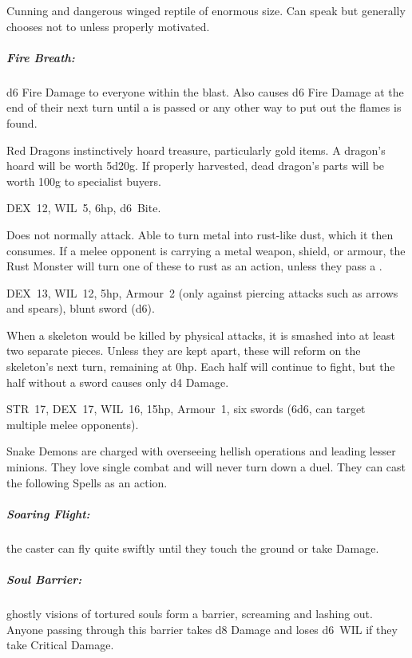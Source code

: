 \documentclass[itdr]{subfiles}
\begin{document}
Cunning and dangerous winged reptile of enormous size. Can speak but generally chooses not to unless properly motivated.

\subparagraph{Fire Breath:} d6 Fire Damage to everyone within the blast. Also causes d6 Fire Damage at the end of their next turn until a  is passed or any other way to put out the flames is found.

Red Dragons instinctively hoard treasure, particularly gold items. A dragon's hoard will be worth 5d20g. If properly harvested, dead dragon's parts will be worth 100g to specialist buyers.

\vfill
\break

\vfill

DEX~12, WIL~5, 6hp, d6~Bite.

Does not normally attack. Able to turn metal into rust-like dust, which it then consumes. If a melee opponent is carrying a metal weapon, shield, or armour, the Rust Monster will turn one of these to rust as an action, unless they pass a .

\vfill

DEX~13, WIL~12, 5hp, Armour~2 (only against piercing attacks such as arrows and spears), blunt sword (d6).

When a skeleton would be killed by physical attacks, it is smashed into at least two separate pieces. Unless they are kept apart, these will reform on the skeleton's next turn, remaining at 0hp. Each half will continue to fight, but the half without a sword causes only d4 Damage.

\vfill


\vspace{-2ex}

STR~17, DEX~17, WIL~16, 15hp, Armour~1, six swords (6d6, can target multiple melee opponents).

Snake Demons are charged with overseeing hellish operations and leading lesser minions. They love single combat and will never turn down a duel. They can cast the following Spells as an action.

\vfill
\break

\subparagraph{Soaring Flight:} the caster can fly quite swiftly until they touch the ground or take Damage.

\subparagraph{Soul Barrier:} ghostly visions of tortured souls form a barrier, screaming and lashing out. Anyone passing through this barrier takes d8 Damage and loses d6~WIL if they take Critical Damage.
\end{document}
